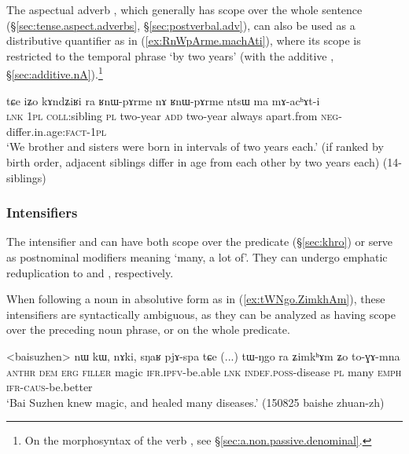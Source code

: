 The aspectual adverb , which generally has scope over the whole sentence (§\ref{sec:tense.aspect.adverbs}, §\ref{sec:postverbal.adv}), can also be used as a distributive quantifier as in (\ref{ex:RnWpArme.machAti}), where its scope is restricted to the temporal phrase  `by two years' (with the additive , §\ref{sec:additive.nA}).\footnote{On the morphosyntax of the verb , see §\ref{sec:a.non.passive.denominal}.  }

\begin{exe}
\ex   \label{ex:RnWpArme.machAti}
 \gll tɕe iʑo kɤndʑiʁi ra ʁnɯ-pɤrme nɤ ʁnɯ-pɤrme ntsɯ ma mɤ-acʰɤt-i \\
 \textsc{lnk} \textsc{1pl} \textsc{coll}:sibling \textsc{pl} two-year \textsc{add} two-year always apart.from \textsc{neg}-differ.in.age:\textsc{fact}-\textsc{1pl} \\
\glt `We brother and sisters were born in intervals of two years each.' (if ranked by birth order, adjacent siblings differ in age from each other by two years each) (14-siblings) 
 \end{exe}
 
\subsubsection{Intensifiers} \label{sec:nominal.intensifier}
The intensifier  and  can have both scope over the predicate (§\ref{sec:khro}) or serve as postnominal modifiers meaning `many, a lot of'. They can undergo emphatic reduplication to  and , respectively.

When following a noun in absolutive form as in (\ref{ex:tWNgo.ZimkhAm}), these intensifiers are syntactically ambiguous, as they can be analyzed as having scope over the preceding noun phrase, or on the whole predicate.

\begin{exe}
\ex \label{ex:tWNgo.ZimkhAm}
\gll <baisuzhen> nɯ kɯ, nɤki, sŋaʁ pjɤ-spa tɕe (...) tɯ-ŋgo ra ʑimkʰɤm ʑo to-ɣɤ-mna \\
\textsc{anthr} \textsc{dem} \textsc{erg} \textsc{filler} magic \textsc{ifr}.\textsc{ipfv}-be.able \textsc{lnk} {  } \textsc{indef}.\textsc{poss}-disease \textsc{pl} many \textsc{emph} \textsc{ifr}-\textsc{caus}-be.better \\
\glt `Bai Suzhen knew magic, and healed many diseases.' (150825 baishe zhuan-zh)
\end{exe}

